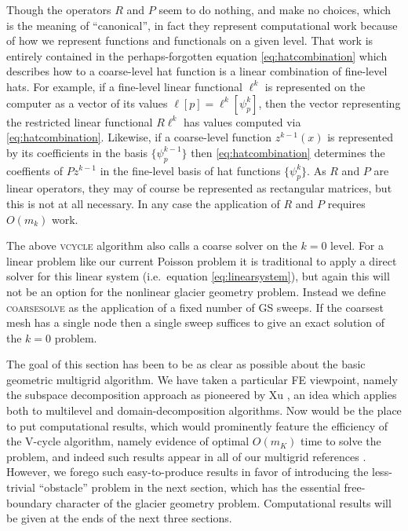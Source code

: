\documentclass[letterpaper,final,12pt,reqno]{amsart}
\begin{document}
Though the operators $R$ and $P$ seem to do nothing, and make no choices, which is the meaning of ``canonical'', in fact they represent computational work because of how we represent functions and functionals on a given level.  That work is entirely contained in the perhaps-forgotten equation \eqref{eq:hatcombination} which describes how to a coarse-level hat function is a linear combination of fine-level hats.  For example, if a fine-level linear functional $\ell^k$ is represented on the computer as a vector of its values $\ell[p] = \ell^k[\psi_p^k]$, then the vector representing the restricted linear functional $R \ell^k$ has values computed via \eqref{eq:hatcombination}.  Likewise, if a coarse-level function $z^{k-1}(x)$ is represented by its coefficients in the basis $\{\psi_p^{k-1}\}$ then \eqref{eq:hatcombination} determines the coeffients of $P z^{k-1}$ in the fine-level basis of hat functions $\{\psi_p^k\}$.  As $R$ and $P$ are linear operators, they may of course be represented as rectangular matrices, but this is not at all necessary.  In any case the application of $R$ and $P$ requires $O(m_k)$ work.

The above \textsc{vcycle} algorithm also calls a coarse solver on the $k=0$ level.  For a linear problem like our current Poisson problem it is traditional to apply a direct solver for this linear system (i.e.~equation \eqref{eq:linearsystem}), but again this will not be an option for the nonlinear glacier geometry problem.  Instead we define \textsc{coarsesolve} as the application of a fixed number of GS sweeps.  If the coarsest mesh has a single node then a single sweep suffices to give an exact solution of the $k=0$ problem.

The goal of this section has been to be as clear as possible about the basic geometric multigrid algorithm.  We have taken a particular FE viewpoint, namely the subspace decomposition approach as pioneered by Xu \cite{Xu1992}, an idea which applies both to multilevel and domain-decomposition algorithms.  Now would be the place to put computational results, which would prominently feature the efficiency of the V-cycle algorithm, namely evidence of optimal $O(m_K)$ time to solve the problem, and indeed such results appear in all of our multigrid references \cite{Briggsetal2000,Bueler2021,Elmanetal2014,Trottenbergetal2001}.  However, we forego such easy-to-produce results in favor of introducing the less-trivial ``obstacle'' problem in the next section, which has the essential free-boundary character of the glacier geometry problem.  Computational results will be given at the ends of the next three sections.
\end{document}
